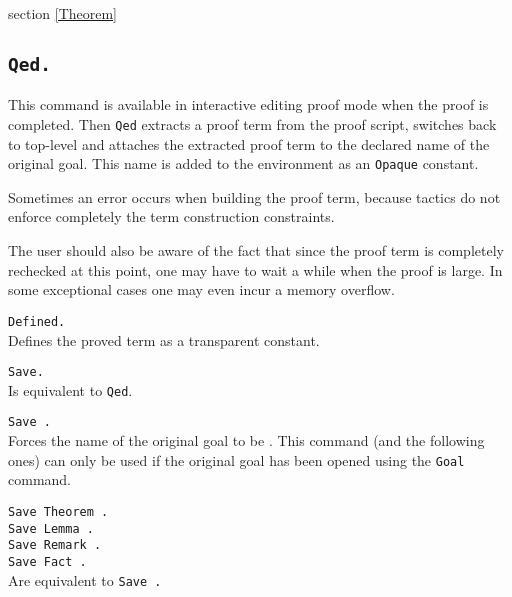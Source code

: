 \begin{ErrMsgs}
\item {}
\end{ErrMsgs}

\SeeAlso section \ref{Theorem}

\subsection{\tt Qed.}\label{Qed}
This command is available in interactive editing proof mode when the
proof is completed.  Then {\tt Qed} extracts a proof term from the
proof script, switches back to {\Coq} top-level and attaches the
extracted proof term to the declared name of the original goal. This
name is added to the environment as an {\tt Opaque} constant.

\begin{ErrMsgs}
\item {}
\item Sometimes an error occurs when building the proof term,
because tactics do not enforce completely the term construction
constraints.

The user should also be aware of the fact that since the proof term is
completely rechecked at this point, one may have to wait a while when
the proof is large. In some exceptional cases one may even incur a
memory overflow.
\end{ErrMsgs}

\begin{Variants}
\item {\tt Defined.} \label{Defined} \\
  Defines the proved term as a transparent constant.
\item {\tt Save.}\\
  Is equivalent to {\tt Qed}.
\item {\tt Save {\ident}.}\\ Forces the name of the original goal to
be {\ident}.  This command (and the following ones) can only be used
if the original goal has been opened using the {\tt Goal} command.
\item {\tt Save Theorem {\ident}.} \\
 {\tt Save Lemma {\ident}.} \\
 {\tt Save Remark {\ident}.}\\
 {\tt Save Fact {\ident}.}\\
  Are equivalent to {\tt Save {\ident}.} 
\end{Variants}


